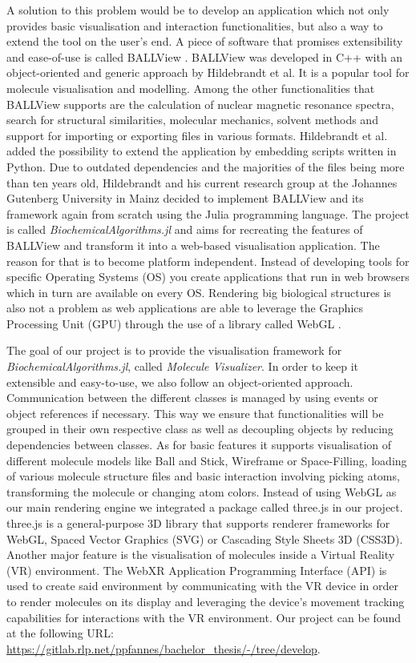 A solution to this problem would be to develop an application which not only provides basic visualisation and interaction functionalities, but also a way to extend the tool on the user's end. A piece of software that promises extensibility and ease-of-use is called BALLView \cite{10.1093/bioinformatics/bti818, 10.1007/s10822-005-9027-x}. BALLView was developed in C++ with an object-oriented and generic approach by Hildebrandt et al. It is a popular tool for molecule visualisation and modelling. Among the other functionalities that BALLView supports are the calculation of nuclear magnetic resonance spectra, search for structural similarities, molecular mechanics, solvent methods and support for importing or exporting files in various formats. Hildebrandt et al. added the possibility to extend the application by embedding scripts written in Python. Due to outdated dependencies and the majorities of the files being more than ten years old, Hildebrandt and his current research group at the Johannes Gutenberg University in Mainz decided to implement BALLView and its framework again from scratch using the Julia programming language. The project is called \textit{BiochemicalAlgorithms.jl} and aims for recreating the features of BALLView and transform it into a web-based visualisation application. The reason for that is to become platform independent. Instead of developing tools for specific Operating Systems (OS) you create applications that run in web browsers which in turn are available on every OS. Rendering big biological structures is also not a problem as web applications are able to leverage the Graphics Processing Unit (GPU) through the use of a library called WebGL \cite{BibEntry2011Jul}. 

The goal of our project is to provide the visualisation framework for \textit{BiochemicalAlgorithms.jl}, called \textit{Molecule Visualizer}. In order to keep it extensible and easy-to-use, we also follow an object-oriented approach. Communication between the different classes is managed by using events or object references if necessary. This way we ensure that functionalities will be grouped in their own respective class as well as decoupling objects by reducing dependencies between classes. As for basic features it supports visualisation of different molecule models like Ball and Stick, Wireframe or Space-Filling, loading of various molecule structure files and basic interaction involving picking atoms, transforming the molecule or changing atom colors. Instead of using WebGL as our main rendering engine we integrated a package called three.js \cite{BibEntry2022Oct} in our project. three.js is a general-purpose 3D library that supports renderer frameworks for WebGL, Spaced Vector Graphics (SVG) or Cascading Style Sheets 3D (CSS3D). Another major feature is the visualisation of molecules inside a Virtual Reality (VR) environment. The WebXR \cite{BibEntry2022Aug} Application Programming Interface (API) is used to create said environment by communicating with the VR device in order to render molecules on its display and leveraging the device's movement tracking capabilities for interactions with the VR environment. Our project can be found at the following URL: \url{https://gitlab.rlp.net/ppfannes/bachelor_thesis/-/tree/develop}.

